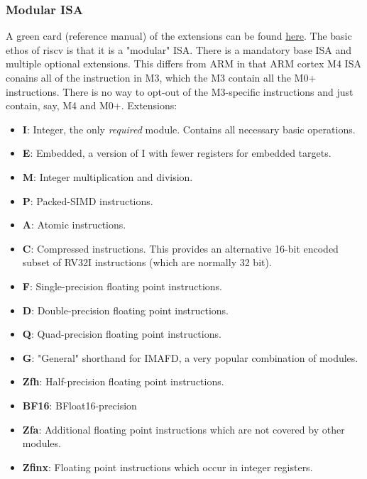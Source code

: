 \documentclass[10pt,a4paper]{article}
\begin{document}
      \subsubsection{Modular ISA}
        A green card (reference manual) of the extensions can be found \href{http://riscvbook.com/greencard-20181213.pdf}{here}.
        \newline
        The basic ethos of riscv is that it is a "modular" ISA. There is a mandatory base ISA and multiple optional extensions. This differs from ARM in that ARM cortex M4 ISA conains all of the instruction in M3, which the M3 contain all the M0+ instructions. There is no way to opt-out of the M3-specific instructions and just contain, say, M4 and M0+.
        \newline
        Extensions:
        \begin{itemize}
          \item \textbf{I}: Integer, the only \textit{required} module. Contains all necessary basic operations.
          \item \textbf{E}: Embedded, a version of I with fewer registers for embedded targets.
          \item \textbf{M}: Integer multiplication and division.
          \item \textbf{P}: Packed-SIMD instructions.
          \item \textbf{A}: Atomic instructions.
          \item \textbf{C}: Compressed instructions. This provides an alternative 16-bit encoded subset of RV32I instructions (which are normally 32 bit).
          \item \textbf{F}: Single-precision floating point instructions.
          \item \textbf{D}: Double-precision floating point instructions.
          \item \textbf{Q}: Quad-precision floating point instructions.
          \item \textbf{G}: "General" shorthand for IMAFD, a very popular combination of modules.
          \item \textbf{Zfh}: Half-precision floating point instructions.
          \item \textbf{BF16}: BFloat16-precision
          \item \textbf{Zfa}: Additional floating point instructions which are not covered by other modules.
          \item \textbf{Zfinx}: Floating point instructions which occur in integer registers.

\end{itemize}
\end{document}
